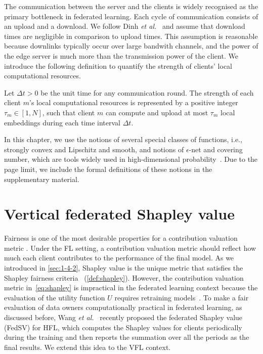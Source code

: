 The communication between the server and the clients is widely recognised as the primary bottleneck in federated learning. Each cycle of communication consists of an upload and a download. We follow Dinh \textit{et al.}~\cite{dinh2020federated} and assume that  download times are negligible in comparison to upload times. This assumption is reasonable because downlinks typically occur over large bandwith channels, and the power of the edge server is much more than the transmission power of the client. We introduce the following definition to quantify the strength of clients' local computational resources.

\begin{definition} \label{def:communication}
    Let $\Delta t > 0$ be the unit time for any communication round. The strength of each client $m$'s local computational resources is represented by a positive integer $\tau_m \in [1, N]$, such that client $m$ can compute and upload at most $\tau_m$ local embeddings during each time interval $\Delta t$. 
\end{definition}

In this chapter, we use the notions of several special classes of functions, i.e., strongly convex and Lipschitz and smooth, and notions of $\epsilon$-net and covering number, which are tools widely used in high-dimensional probability~\cite{vershynin2018high}. Due to the page limit, we include the formal definitions of these notions in the supplementary material.

\section{Vertical federated Shapley value} \label{sec:8-4}
Fairness is one of the most desirable properties for a contribution valuation metric \cite{ghorbani2019data,pei2020survey}. Under the FL setting, a contribution valuation metric should reflect how much each client contributes to the performance of the final model. As we introduced in \autoref{sec:1-4-2}, Shapley value is the unique metric that satisfies the Shapley fairness criteria~\cite{shapley201617} (\autoref{def:shapley}). However, the contribution valuation metric in~\eqref{eq:shapley} is impractical in the federated learning context because the evaluation of the utility function $U$ requires retraining models~\cite{ghorbani2019data,wang2020principled}. To make a fair evaluation of data owners computationally practical in federated learning, as discussed before, Wang \textit{et al.}~\cite{wang2020principled} recently proposed the federated Shapley value (FedSV) for HFL, which computes the Shapley values for clients periodically during the training and then reports the summation over all the periods as the final results. We extend this idea to the VFL context. 

